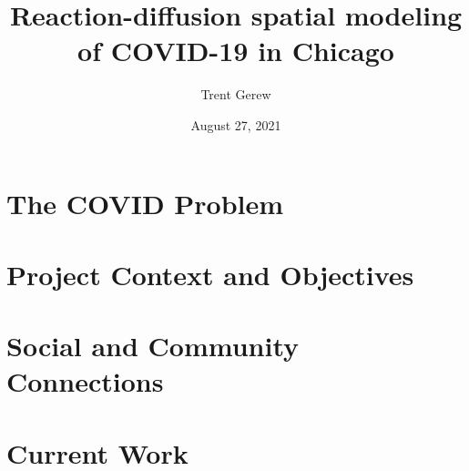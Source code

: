 \documentclass[10pt,aspectratio=169]{beamer}
\begin{document}
  

\title{Reaction-diffusion spatial modeling of COVID-19 in Chicago}

\author[The SoReMo Initiative]{Trent Gerew}
\date{August 27, 2021}




\begin{frame} \titlepage \end{frame}

%

%
 
 \section{The COVID Problem}
 	
 	
 	
 \section{Project Context and Objectives}
 	
 	
	
	
 \section{Social and Community Connections}
 	
 \section{Current Work}
 	
\end{document}
